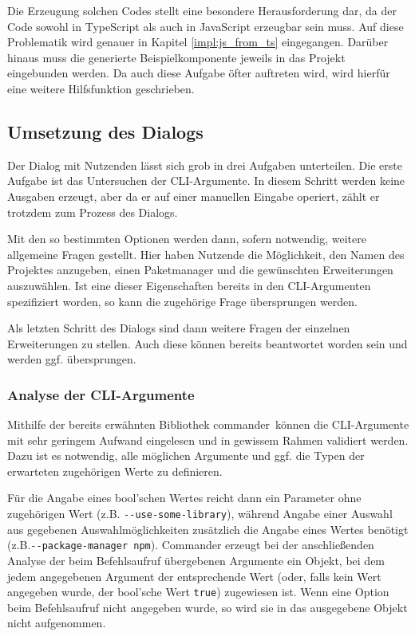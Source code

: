 Die Erzeugung solchen Codes stellt eine besondere Herausforderung dar, da der Code sowohl in TypeScript als auch in JavaScript erzeugbar sein muss. Auf diese Problematik wird genauer in Kapitel \ref{impl:js_from_ts} eingegangen. Darüber hinaus muss die generierte Beispielkomponente jeweils in das Projekt eingebunden werden. Da auch diese Aufgabe öfter auftreten wird, wird hierfür eine weitere Hilfsfunktion geschrieben.

\subsection{Umsetzung des Dialogs}
Der Dialog mit Nutzenden lässt sich grob in drei Aufgaben unterteilen. Die erste Aufgabe ist das Untersuchen der \gls{CLI}-Argumente. In diesem Schritt werden keine Ausgaben erzeugt, aber da er auf einer manuellen Eingabe operiert, zählt er trotzdem zum Prozess des Dialogs.

Mit den so bestimmten Optionen werden dann, sofern notwendig, weitere allgemeine Fragen gestellt. Hier haben Nutzende die Möglichkeit, den Namen des Projektes anzugeben, einen Paketmanager und die gewünschten Erweiterungen auszuwählen. Ist eine dieser Eigenschaften bereits in den \gls{CLI}-Argumenten spezifiziert worden, so kann die zugehörige Frage übersprungen werden.

Als letzten Schritt des Dialogs sind dann weitere Fragen der einzelnen Erweiterungen zu stellen. Auch diese können bereits beantwortet worden sein und werden ggf. übersprungen.

\subsubsection{Analyse der CLI-Argumente}
Mithilfe der bereits erwähnten Bibliothek \glqq commander\grqq\ können die \gls{CLI}-Argumente mit sehr geringem Aufwand eingelesen und in gewissem Rahmen validiert werden. Dazu ist es notwendig, alle möglichen Argumente und ggf. die Typen der erwarteten zugehörigen Werte zu definieren.

Für die Angabe eines bool'schen Wertes reicht dann ein Parameter ohne zugehörigen Wert (z.B. \verb|--use-some-library|), während Angabe einer Auswahl aus gegebenen Auswahlmöglichkeiten zusätzlich die Angabe eines Wertes benötigt (z.B.\linebreak \verb|--package-manager npm|). Commander erzeugt bei der anschließenden Analyse der beim Befehlsaufruf übergebenen Argumente ein Objekt, bei dem jedem angegebenen Argument der entsprechende Wert (oder, falls kein Wert angegeben wurde, der bool'sche Wert \verb|true|) zugewiesen ist. Wenn eine Option beim Befehlsaufruf nicht angegeben wurde, so wird sie in das ausgegebene Objekt nicht aufgenommen.

